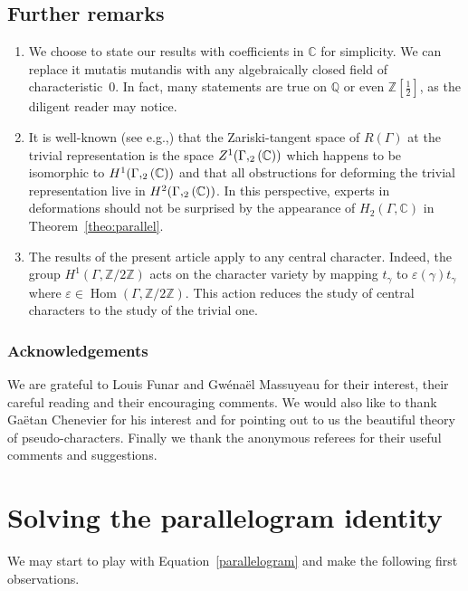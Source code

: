 \documentclass[11pt]{article}
\newcommand{\eg}{e.g.,\xspace}
\newcommand{\Subsection}{\subsection}
\newcommand{\NoChangel}[1]{%
\expandafter\let\csname old\string#1\endcsname=#1
\let#1=\relax
\newcommand{#1}{\mathcode`l="716C\csname old\string#1\endcsname\mathcode`l="7160 }%
}
\theoremstyle{definition}
\newcommand{\ZZ}{\mathbb{Z}}
\newcommand{\QQ}{\mathbb{Q}}
\newcommand{\CC}{\mathbb{C}}
\newcommand{\petitsl}{\mathrm{sl}}\NoChangel{\petitsl}
\newcommand{\Hom}{\operatorname{Hom}}
\begin{document}
\Subsection{Further remarks}

\begin{enumerate}
\item
We choose to state our results with coefficients in $\CC$ for
simplicity. We can replace it mutatis mutandis with any
algebraically closed field of characteristic~0. In fact, many statements are
true on $\QQ$ or even $\ZZ[\frac{1}{2}]$, as the diligent reader may notice.

\item
It is well-known (see \eg \cite{Weil}) that the
Zariski-tangent space of $R(\Gamma)$ at the trivial representation is the
space $Z^1(\Gamma,\petitsl_2(\CC))$ which happens to be isomorphic
to $H^1(\Gamma,\petitsl_2(\CC))$ and that all obstructions for
deforming the trivial representation live in
$H^2(\Gamma, \petitsl_2(\CC))$.
In this perspective, experts in deformations should not be surprised by
the appearance of $H_2(\Gamma,\CC)$ in Theorem~\ref{theo:parallel}.

\item
The results of the present article apply to any central character.
Indeed, the group $H^1(\Gamma,\ZZ/2\ZZ)$ acts on the character variety by
mapping $t_\gamma$ to $\varepsilon(\gamma)t_\gamma$ where
$\varepsilon\in \Hom(\Gamma,\ZZ/2\ZZ)$. This action reduces the study of
central characters to the study of the trivial one.
\end{enumerate}

\subsubsection*{Acknowledgements}
We are grateful to Louis Funar and Gwénaël Massuyeau for their interest,
their careful reading and their encouraging comments. We would also like to
thank Gaëtan Chenevier for his interest and for pointing out to us the
beautiful theory of pseudo-characters.
Finally we thank the anonymous
referees for their useful comments and suggestions.

\section{Solving the parallelogram identity}

We may start to play with Equation~\eqref{parallelogram} and make the
following first observations.
\end{document}
